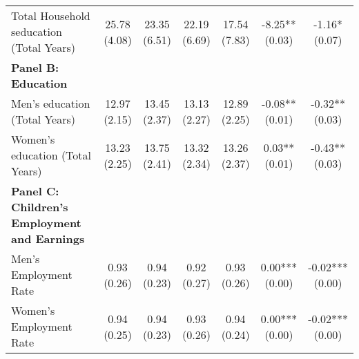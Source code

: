 \begin{table}[H]
{\begin{threeparttable}
\begin{tabular}[t]{lcccccc}
\hspace{1em}Total Household seducation (Total Years) & \specialcell{25.78\\(4.08)} & \specialcell{23.35\\(6.51)} & \specialcell{22.19\\(6.69)} & \specialcell{17.54\\(7.83)} & \specialcell{-8.25**\\(0.03)} & \specialcell{-1.16*\\(0.07)}\\
\textbf{Panel B: Education} & \textbf{} & \textbf{} & \textbf{} & \textbf{} & \textbf{} & \textbf{}\\
\addlinespace
\hspace{1em}Men’s education (Total Years) & \specialcell{12.97\\(2.15)} & \specialcell{13.45\\(2.37)} & \specialcell{13.13\\(2.27)} & \specialcell{12.89\\(2.25)} & \specialcell{-0.08**\\(0.01)} & \specialcell{-0.32**\\(0.03)}\\
\hspace{1em}Women’s education (Total Years) & \specialcell{13.23\\(2.25)} & \specialcell{13.75\\(2.41)} & \specialcell{13.32\\(2.34)} & \specialcell{13.26\\(2.37)} & \specialcell{0.03**\\(0.01)} & \specialcell{-0.43**\\(0.03)}\\
\textbf{Panel C: Children's Employment and Earnings} & \textbf{} & \textbf{} & \textbf{} & \textbf{} & \textbf{} & \textbf{}\\
\hspace{1em}Men’s Employment Rate & \specialcell{0.93\\(0.26)} & \specialcell{0.94\\(0.23)} & \specialcell{0.92\\(0.27)} & \specialcell{0.93\\(0.26)} & \specialcell{0.00***\\(0.00)} & \specialcell{-0.02***\\(0.00)}\\
\hspace{1em}Women’s Employment Rate & \specialcell{0.94\\(0.25)} & \specialcell{0.94\\(0.23)} & \specialcell{0.93\\(0.26)} & \specialcell{0.94\\(0.24)} & \specialcell{0.00***\\(0.00)} & \specialcell{-0.02***\\(0.00)}\\

\end{tabular}
\end{threeparttable}}
\end{table}
